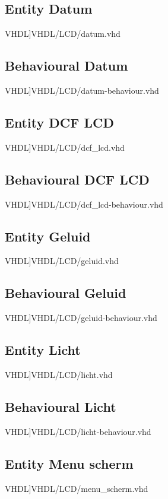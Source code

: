 \subsection{Entity Datum}
\scriptsize 
 VHDL]{VHDL/LCD/datum.vhd}
\normalsize
\label{code:ent_datum}
\subsection{Behavioural Datum}
\scriptsize 
 VHDL]{VHDL/LCD/datum-behaviour.vhd}
\normalsize
\label{code:beh_datum}
\subsection{Entity DCF LCD}
\scriptsize 
 VHDL]{VHDL/LCD/dcf_lcd.vhd}
\normalsize
\label{code:ent_dcf-lcd}
\subsection{Behavioural DCF LCD}
\scriptsize 
 VHDL]{VHDL/LCD/dcf_lcd-behaviour.vhd}
\normalsize
\label{code:beh_dcf-lcd}
\subsection{Entity Geluid}
\scriptsize 
 VHDL]{VHDL/LCD/geluid.vhd}
\normalsize
\label{code:ent_geluid}
\subsection{Behavioural Geluid}
\scriptsize 
 VHDL]{VHDL/LCD/geluid-behaviour.vhd}
\normalsize
\label{code:beh_geluid}
\subsection{Entity Licht}
\scriptsize 
 VHDL]{VHDL/LCD/licht.vhd}
\normalsize
\label{code:ent_licht}
\subsection{Behavioural Licht}
\scriptsize 
 VHDL]{VHDL/LCD/licht-behaviour.vhd}
\normalsize
\label{code:beh_licht}
\subsection{Entity Menu scherm}
\scriptsize 
 VHDL]{VHDL/LCD/menu_scherm.vhd}
\normalsize
\label{code:ent_menu_scherm}
